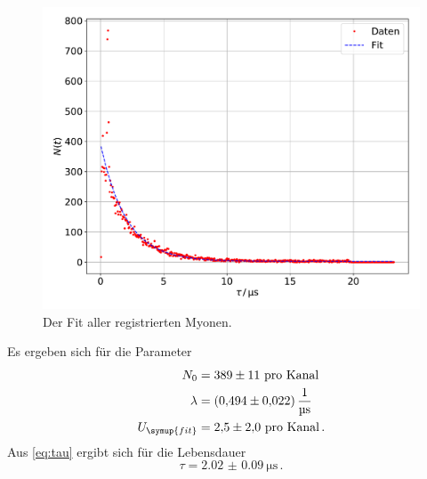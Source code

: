 \documentclass[
  bibliography=totoc,     %
  captions=tableheading,  %
  titlepage=firstiscover, %
]{scrartcl}
\begin{document}
\begin{figure}
  \centering
  \includegraphics[scale=0.5]{fig20.pdf}
  \caption{Der Fit aller registrierten Myonen.}
  \label{fig:16}
\end{figure}
\noindent
Es ergeben sich für die Parameter
\begin{align}
  N_0 &= \num{389(11)} \ \text{pro Kanal} \\
  \lambda &= \SI{0.494(22)}{\per\micro\second} \label{dauer} \\
  U_{\symup{fit}} &= \num{2.5(20)} \ \text{pro Kanal} \label{Untergrund} \, .
\end{align}
Aus \eqref{eq:tau} ergibt sich für die Lebensdauer
\begin{equation}
  \tau = \SI{2.02(9)}{\micro\second} \, .
\end{equation}
\clearpage
\end{document}
